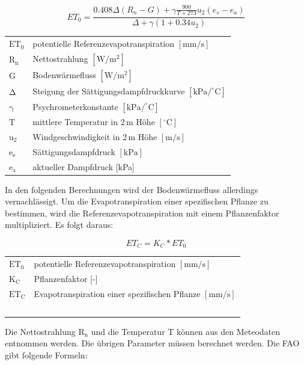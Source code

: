 \begin{equation}
\label{eq:penman_ref}
ET_0=\frac{0.408\Delta \left(R_n-G\right)+\gamma \frac{900}{T+273}u_2\left(e_s-e_a\right)}{\Delta +\gamma\left(1+0.34u_2\right)}
\end{equation}
\begin{table}[H]
\centering
\begin{tabular}{ll}
$\mathrm{ET_0}$ & potentielle Referenzevapotranspiration $\mathrm{[mm/s]}$\\
$\mathrm{R_n}$ & Nettostrahlung $\mathrm{[W/m^2]}$ \\
$\mathrm{G}$ & Bodenwärmefluss $\mathrm{[W/m^2]}$\\
$\mathrm{\Delta}$ & Steigung der Sättigungsdampfdruckkurve $\mathrm{[kPa/^{\circ}C]}$\\
$\mathrm{\gamma}$ & Psychrometerkonstante $\mathrm{[kPa/^{\circ}C]}$\\
$\mathrm{T}$ & mittlere Temperatur in 2\,m Höhe $\mathrm{[^{\circ}C]}$\\
$\mathrm{u_2}$ & Windgeschwindigkeit in 2\,m Höhe $\mathrm{[m/s]}$\\
$\mathrm{e_s}$ & Sättigungsdampfdruck $\mathrm{[kPa]}$\\
$\mathrm{e_a}$ & aktueller Dampfdruck [kPa]\\
\end{tabular}
\end{table}

In den folgenden Berechnungen wird der Bodenwärmefluss allerdings vernachlässigt. Um die Evapotranspiration einer spezifischen Pflanze zu bestimmen, wird die Referenzevapotranspiration mit einem Pflanzenfaktor multipliziert. Es folgt daraus:

\begin{equation}
\label{eq:penman_spez}
ET_C=K_C*ET_0
\end{equation}
\begin{table}[H]
\centering
\begin{tabular}{ll}
$\mathrm{ET_0}$ & potentielle Referenzevapotranspiration $\mathrm{[mm/s]}$\\
$\mathrm{K_C}$ & Pflanzenfaktor [-]\\
$\mathrm{ET_C}$ & Evapotranspiration einer spezifischen Pflanze $\mathrm{[mm/s]}$\\\
\end{tabular}
\end{table}

Die Nettostrahlung $\mathrm{R_n}$ und die Temperatur T können aus den Meteodaten entnommen werden. Die übrigen Parameter müssen berechnet werden. Die FAO\,\cite{fao} gibt folgende Formeln:

